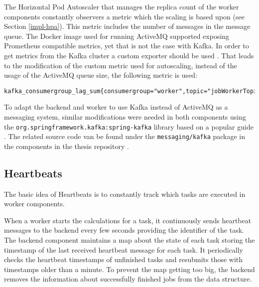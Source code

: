 The Horizontal Pod Autoscaler that manages the replica count of the worker components constantly observers a metric which the scaling is based upon (see Section \ref{impl-hpa}). This metric includes the number of messages in the message queue. The Docker image used for running ActiveMQ supported exposing Prometheus compatible metrics, yet that is not the case with Kafka. In order to get metrics from the Kafka cluster a custom exporter should be used \cite{KafkaExporter}. That leads to the modification of the custom metric used for autoscaling, instead of the usage of the ActiveMQ queue size, the following metric is used:

\vspace{0.5cm}
\begin{minipage}{\linewidth}
	\begin{lstlisting}[caption={Metric for the number of unconsumed messages in Kafka}, label={lst:kafka-consumerlag-metric}]
	kafka_consumergroup_lag_sum{consumergroup="worker",topic="jobWorkerTopic"}\end{lstlisting}
\end{minipage}

To adapt the backend and worker to use Kafka instead of ActiveMQ as a messaging system, similar modifications were needed in both components using the \texttt{org.springframework.kafka:spring-kafka} library based on a popular guide . The related source code van be found under the \texttt{messaging/kafka} package in the components in the thesis repository \cite{ThesisRepo}.

\subsection{Heartbeats}


The basic idea of Heartbeats is to constantly track which tasks are executed in worker components.

When a worker starts the calculations for a task, it continuously sends heartbeat messages to the backend every few seconds providing the identifier of the task. The backend component maintains a map about the state of each task storing the timestamp of the last received heartbeat message for each task. It periodically checks the heartbeat timestamps of unfinished tasks and resubmits those with timestamps older than a minute. To prevent the map getting too big, the backend removes the information about successfully finished jobs from the data structure.

